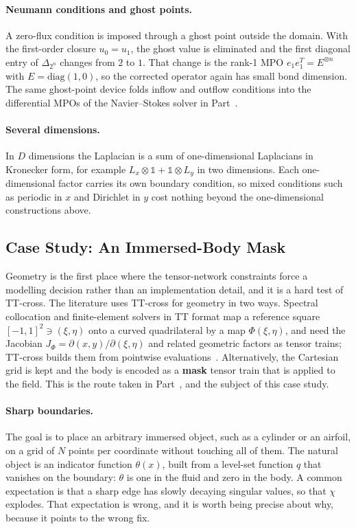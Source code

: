 \paragraph{Neumann conditions and ghost points.}
A zero-flux condition is imposed through a ghost point outside the domain. With
the first-order closure $u_0 = u_1$, the ghost value is eliminated and the first
diagonal entry of $\Delta_{2^n}$ changes from $2$ to $1$. That change is the
rank-1 MPO $e_1 e_1^{T} = E^{\otimes n}$ with $E = \mathrm{diag}(1,0)$, so the
corrected operator again has small bond dimension. The same ghost-point device
folds inflow and outflow conditions into the differential MPOs of the
Navier--Stokes solver in Part~.

\paragraph{Several dimensions.}
In $D$ dimensions the Laplacian is a sum of one-dimensional Laplacians in
Kronecker form, for example $L_x \otimes \mathbb{1} + \mathbb{1} \otimes L_y$ in
two dimensions. Each one-dimensional factor carries its own boundary condition,
so mixed conditions such as periodic in $x$ and Dirichlet in $y$ cost nothing
beyond the one-dimensional constructions above.

\subsection{Case Study: An Immersed-Body Mask}
\label{subsec:tt-cross-geometry}

Geometry is the first place where the tensor-network constraints force a
modelling decision rather than an implementation detail, and it is a hard test
of TT-cross. The literature uses TT-cross for geometry in two ways. Spectral
collocation and finite-element solvers in TT format map a reference square
$[-1,1]^2 \ni (\xi, \eta)$ onto a curved quadrilateral by a map
$\Phi(\xi,\eta)$, and need the Jacobian $J_\Phi = \partial(x,y)/\partial(\xi,\eta)$
and related geometric factors as tensor trains; TT-cross builds them from
pointwise evaluations~\cite{Adak2024,Kornev2024}. Alternatively, the Cartesian
grid is kept and the body is encoded as a \textbf{mask} tensor train that is
applied to the field. This is the route taken in Part~, and the
subject of this case study.

\paragraph{Sharp boundaries.}
The goal is to place an arbitrary immersed object, such as a cylinder or an
airfoil, on a grid of $N$ points per coordinate without touching all of them.
The natural object is an indicator function $\theta(x)$, built from a level-set
function $q$ that vanishes on the boundary: $\theta$ is one in the fluid and
zero in the body. A common expectation is that a sharp edge has slowly decaying
singular values, so that $\chi$ explodes. That expectation is wrong, and it is
worth being precise about why, because it points to the wrong fix.

